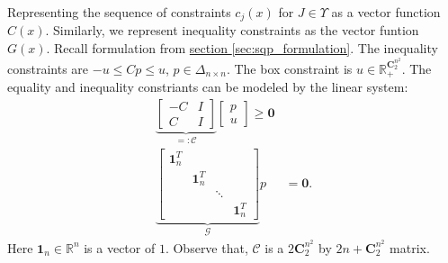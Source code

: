 \documentclass[11pt]{article}
\theoremstyle{definition}
\numberwithin{equation}{subsection}
\begin{document}
        Representing the sequence of constraints $c_j(x)$ for $J \in \Upsilon$ as a vector function $C(x)$. 
        Similarly, we represent inequality constraints as the vector funtion $G(x)$. 
        Recall formulation from \hyperref[sec:sqp_formulation]{section \ref*{sec:sqp_formulation}}. 
        The inequality constraints are $-u \le Cp \le u$, $p \in \Delta_{n\times n}$. 
        The box constraint is $u\in \mathbb R_+^{\mathbf C_2^{n^2}}$. 
        The equality and inequality constriants can be modeled by the linear system: 
        \begin{align*}
            \underbrace{\begin{bmatrix}
                -C & I
                \\
                C & I
            \end{bmatrix}}_{=: \mathcal C}
            \begin{bmatrix}
                p \\ u
            \end{bmatrix}
            \ge
            \mathbf 0 
            \\
            \underbrace{
                \begin{bmatrix}
                    \mathbf 1_n^T  & & &
                    \\
                    & \mathbf 1_n^T & &
                    \\
                    & & \ddots & 
                    \\
                    & & & \mathbf 1_n^T
                \end{bmatrix}
            }_{\mathcal G}
            p &= \mathbf 0.
        \end{align*}
        Here $\mathbf 1_n \in \mathbb R^n$ is a vector of $1$. 
        Observe that, $\mathcal C$ is a $2 \mathbf C_2^{n^2}$ by $2n + \mathbf C_2^{n^2}$ matrix. 

        





        


\appendix



\end{document}
